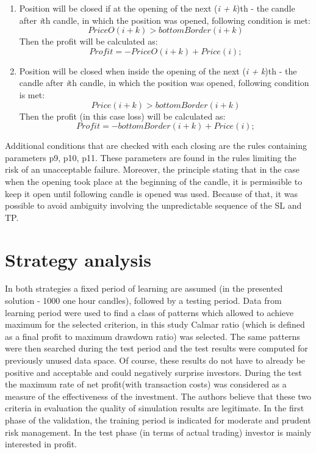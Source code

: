 \documentclass{tewiart}
\begin{document}
\begin{enumerate}
\item Position will be closed if at the opening of the next (\textit{i + k})th - the candle after \textit{i}th candle, in which the position was opened, following condition is met: 
\begin{equation}
PriceO(i+k) >bottomBorder(i+k)
\end{equation}                          
Then the profit will be calculated as:
\begin{equation}
Profit =-PriceO (i+k)  + Price(i) ;
\end{equation}

\item Position will be closed when inside the opening of the next (\textit{i + k})th - the candle after \textit{i}th candle, in which the position was opened, following condition is met:
\begin{equation}
Price(i+k) >bottomBorder(i+k)
\end{equation}                           
Then the profit (in this case loss) will be calculated as:
\begin{equation}
Profit =-bottomBorder (i+k) +  Price(i) ;
\end{equation}

\end{enumerate}
Additional conditions that are checked with each closing are the rules containing parameters p9, p10, p11. These parameters are found in the rules limiting the risk of an unacceptable failure. Moreover, the principle stating that in the case when the opening took place at the beginning of the candle, it is permissible to keep it open until following candle is opened was used. Because of that,  it was possible to avoid ambiguity involving the unpredictable sequence of the SL and TP.


\section{Strategy analysis}
In both strategies a fixed period of learning are assumed (in the presented solution - 1000 one hour candles), followed by a testing period. Data from learning period were used to find a class of patterns which allowed to achieve maximum for the selected criterion, in this study Calmar ratio (which is defined as a final profit to maximum drawdown ratio) was selected. The same patterns were then searched during the test period and the test results were computed for previously unused data space. Of course, these results do not have to already be positive and acceptable and could negatively surprise investors. During the test the maximum rate of net profit(with transaction costs) was considered as a measure of the effectiveness of the investment. The authors believe that these two criteria in evaluation the quality of simulation results are legitimate. In the first phase of the validation, the training period is indicated for moderate and prudent risk management. In the test phase (in terms of actual trading) investor is mainly interested in profit.\\
\end{document}
